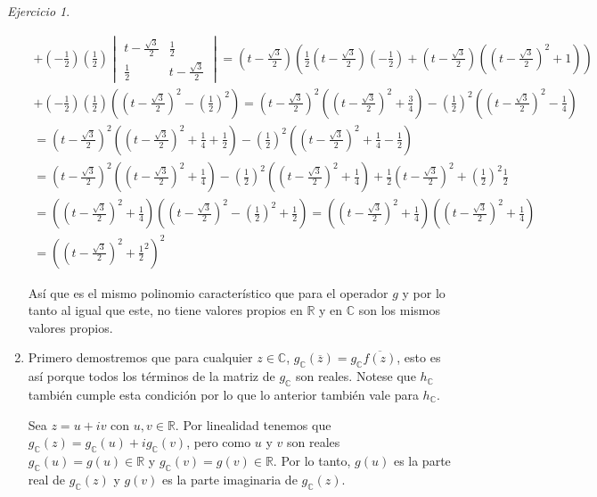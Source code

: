 \documentclass[11pt,a4paper]{article}
\theoremstyle{definition}
\theoremstyle{remark}
\newtheorem{exc}{Ejercicio}
\begin{document}
\begin{exc}
\begin{enumerate}
\begin{multline}
	 		 +(-\frac{1}{2})(\frac{1}{2})\begin{vmatrix}
	 		  		    	    	t-\frac{\sqrt{3}}{2} & \frac{1}{2}
	 		  		    	    	\\ \frac{1}{2} &  t-\frac{\sqrt{3}}{2}
	 		  		    	    	\end{vmatrix} = (t-\frac{\sqrt{3}}{2})(\frac{1}{2}(t-\frac{\sqrt{3}}{2})(-\frac{1}{2})+(t-\frac{\sqrt{3}}{2})((t-\frac{\sqrt{3}}{2})^2+1))\\
	 		+(-\frac{1}{2})(\frac{1}{2})((t-\frac{\sqrt{3}}{2})^2-(\frac{1}{2})^2)= (t-\frac{\sqrt{3}}{2})^2((t-\frac{\sqrt{3}}{2})^2+\frac{3}{4})-(\frac{1}{2})^2 ((t-\frac{\sqrt{3}}{2})^2-\frac{1}{4})\\
	 		=(t-\frac{\sqrt{3}}{2})^2((t-\frac{\sqrt{3}}{2})^2+\frac{1}{4}+\frac{1}{2})-(\frac{1}{2})^2 ((t-\frac{\sqrt{3}}{2})^2+\frac{1}{4}-\frac{1}{2})
	 		\\ = (t-\frac{\sqrt{3}}{2})^2((t-\frac{\sqrt{3}}{2})^2+\frac{1}{4})-(\frac{1}{2})^2 ((t-\frac{\sqrt{3}}{2})^2+\frac{1}{4})+\frac{1}{2}(t-\frac{\sqrt{3}}{2})^2+(\frac{1}{2})^2\frac{1}{2}
	 		\\ = ((t-\frac{\sqrt{3}}{2})^2+\frac{1}{4})((t-\frac{\sqrt{3}}{2})^2-(\frac{1}{2})^2+\frac{1}{2})=((t-\frac{\sqrt{3}}{2})^2+\frac{1}{4})((t-\frac{\sqrt{3}}{2})^2+\frac{1}{4}) \\
	 		=((t-\frac{\sqrt{3}}{2})^2+\frac{1}{2}^2)^2\end{multline}
	 		
	 		Así que es el mismo polinomio característico que para el operador $ g $ y por lo tanto al igual que este, no tiene valores propios en $ \mathbb{R} $ y en $ \mathbb{C} $ son los mismos valores propios.
	 		
	 		\item 
	 		
	 		Primero demostremos que para cualquier $ z \in \mathbb{C} $, $ g_\mathbb{C}(\overline{z})=g_\mathbb{C}\overline{f(z)} $, esto es así porque todos los términos de la matriz de $ g_\mathbb{C} $ son reales. Notese que $ h_\mathbb{C} $ también cumple esta condición por lo que lo anterior también vale para $ h_\mathbb{C} $.
	 		
	 		Sea $ z = u+iv $ con $ u,v \in \mathbb{R} $. Por linealidad tenemos que $ g_\mathbb{C}(z)=g_\mathbb{C}(u)+ig_\mathbb{C}(v) $, pero como $ u $ y $ v $ son reales $ g_\mathbb{C}(u) = g(u) \in \mathbb{R} $ y $ g_\mathbb{C}(v) = g(v) \in \mathbb{R} $. Por lo tanto, $ g(u) $ es la parte real de $ g_\mathbb{C}(z) $ y $ g(v) $ es la parte imaginaria de $ g_\mathbb{C}(z) $.
	 		

\end{enumerate}
\end{exc}
\end{document}

